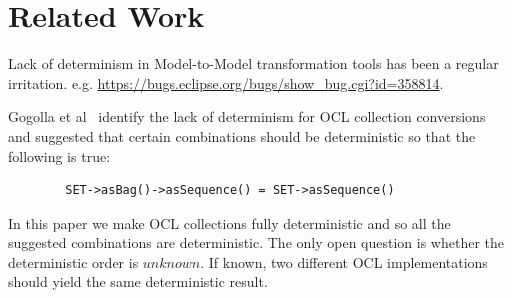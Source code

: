 \documentclass{llncs}
\begin{document}








\section{Related Work}\label{Related Work}

Lack of determinism in Model-to-Model transformation tools has been a regular irritation. e.g. \url{https://bugs.eclipse.org/bugs/show\_bug.cgi?id=358814}.  

Gogolla et al~\cite{OCL-Determinism} identify the lack of determinism for OCL collection conversions and suggested that certain combinations should be deterministic so that the following is true:
\begin{verbatim}
        SET->asBag()->asSequence() = SET->asSequence()
\end{verbatim}
In this paper we make OCL collections fully deterministic and so all the suggested combinations are deterministic. The only open question is whether the deterministic order is $unknown$. If known, two different OCL implementations should yield the same deterministic result. 
\end{document}
